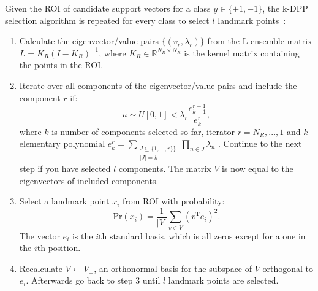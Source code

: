\documentclass[preprint,12pt]{elsarticle}
\newtheorem*{remark}{Remark}
\begin{document}
Given the ROI of candidate support vectors for a class $y \in \{+1,-1\}$, the k-DPP selection algorithm is repeated for every class to select $l$ landmark points~\cite{kulesza2011k}: 
\begin{enumerate}
	\item Calculate the eigenvector/value pairs $\{(v_r,\lambda_r)\}$ from the L-ensemble matrix $L = K_{R}(I - K_{R} )^{-1}$, where $K_{R} \in \mathbb{R}^{N_{R} \times N_{R}} $ is the kernel matrix containing the points in the ROI.
	\item Iterate over all components of the eigenvector/value pairs and include the component $r$ if:
	\begin{equation}
		u \sim U[0, 1] < \lambda_r \frac{e_{k-1}^{r-1}}{e_k^r},
	\end{equation}
	  where $k$ is number of components selected so far, iterator $r = N_{R},...,1$  and $k$ elementary polynomial $e_k^r = \sum_{\substack{J \subseteq \{1,...,r\}\} \\ |J| = k}}\prod_{n \in J} \lambda_n$ . Continue to the next step if you have selected $l$ components. The matrix $V$ is now equal to the eigenvectors of included components. 
	\item Select a landmark point $x_i$ from ROI with probability:
	\begin{equation}
		\mathrm{Pr}(x_i) = \frac{1}{|V|} \sum_{v \in V} (v^\mathrm{T} e_i)^2.
	\end{equation} 
	The vector $e_i$ is the $i$th standard basis, which is all zeros except for a one
	in the $i$th position.
	\item Recalculate $V \leftarrow V_\perp$, an orthonormal basis for the subspace of $V$ orthogonal to $e_i$. Afterwards go back to step 3 until $l$ landmark points are selected.
\end{enumerate}

	
\end{document}
